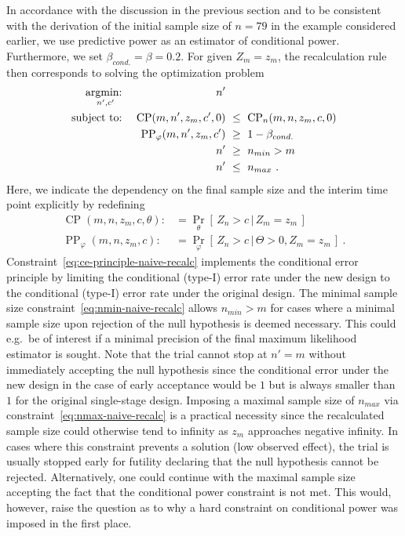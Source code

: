 \documentclass{article}
\renewcommand{\Pr}{\operatorname{Pr}}
\newcommand{\st}{\operatorname{subject\ to:\ }}
\newcommand{\argmin}[1]{\operatornamewithlimits{argmin:\ }_{#1}}
\newcommand{\CP}{\ensuremath{\operatorname{CP}}}
\newcommand{\PP}{\ensuremath{\operatorname{PP}}}
\renewcommand{\Pr}{\ensuremath{\operatorname{Pr}}}
\newcommand{\cond}{\ensuremath{\,|\,}}
\begin{document}
In accordance with the discussion in the previous section
and to be consistent with the derivation of the
initial sample size of $n=79$ in the example considered earlier, 
we use predictive power as an estimator of conditional power.
Furthermore, we set $\beta_{cond.}=\beta=0.2$.
For given $Z_m = z_m$, the recalculation rule then corresponds to solving 
the optimization problem
\begin{align}
    \argmin{n', c'} &&                   n' & \label{eq:naive-recalc}\\
    \st             && \CP(m, n', z_m, c', 0) &\ \leq \ \CP_n(m, n, z_m, c, 0) \label{eq:ce-principle-naive-recalc} \\
                    &&    \PP_\varphi(m, n', z_m, c') &\ \geq \ 1 - \beta_{cond.} \\
                    &&                   n' &\ \geq \ n_{min} > m \label{eq:nmin-naive-recalc} \\
                    &&                   n' &\ \leq \ n_{max} \label{eq:nmax-naive-recalc} \ . 
\end{align}
Here, we indicate the dependency on the 
final sample size and the interim time point explicitly by redefining
\begin{align}
    \CP(m, n, z_m, c, \theta) :&= \Pr_\theta[\,Z_n > c \cond Z_m = z_m\,] \\
    \PP_\varphi(m, n, z_m, c) :&= \Pr_\varphi[\,Z_n > c \cond \Theta >0, Z_m = z_m\,] \ .
\end{align}
Constraint~\eqref{eq:ce-principle-naive-recalc} implements the conditional
error principle by limiting the conditional (type-I) error rate under the new design to 
the conditional (type-I) error rate under the original design.
The minimal sample size constraint~\eqref{eq:nmin-naive-recalc} allows  $n_{min}>m$ for cases where a minimal sample size upon rejection of the null hypothesis is deemed necessary.
This could e.g.~be of interest if a minimal precision of the final maximum likelihood estimator is sought.
Note that the trial cannot stop at $n'=m$ without immediately accepting the
null hypothesis since the conditional error under the new design in the case of early acceptance would be $1$ but is always smaller than $1$ for the original single-stage design.
Imposing a maximal sample size of $n_{max}$ via constraint~\eqref{eq:nmax-naive-recalc} is a practical necessity since the 
recalculated sample size could otherwise tend to infinity as $z_m$ approaches negative infinity.
In cases where this constraint prevents a solution (low observed effect), 
the trial is usually stopped early for futility declaring that the null hypothesis cannot be rejected. 
Alternatively, one could continue with the maximal sample size accepting
the fact that the conditional power constraint is not met.
This would, however, raise the question as to why a hard constraint on conditional power was imposed in the first place.
\end{document}
